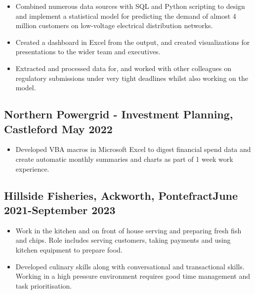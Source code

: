 \documentclass[9pt]{extarticle}
\begin{document}
\begin{minipage}{0.65\textwidth}
	\begin{itemize}
		\item Combined numerous data sources with SQL and Python scripting to design and implement a statistical model for predicting the demand of almost 4 million customers on low-voltage electrical distribution networks.\vspace{-.1cm}
		\item Created a dashboard in Excel from the output, and created visualizations for presentations to the wider team and executives. \vspace{-.1cm}
		\item Extracted and processed data for, and worked with other colleagues on regulatory submissions under very tight deadlines whilst also working on the model.
	\end{itemize}

	\vspace{-.5cm}




	\subsection{Northern Powergrid - Investment Planning, Castleford \hfill May 2022}
	\begin{itemize}
		\item Developed VBA macros in Microsoft Excel to digest financial spend data and create automatic monthly summaries and charts as part of 1 week work experience.
	\end{itemize}
	\vspace{-.5cm}



	\subsection{Hillside Fisheries, Ackworth, Pontefract\hfill June 2021-September 2023}
	\vspace{-.1cm}
	\begin{itemize}
		\item Work in the kitchen and on front of house serving and preparing fresh fish and chips. Role includes serving customers, taking payments and using kitchen equipment to prepare food.
		      \vspace{-.1cm}
		\item Developed culinary skills along with conversational and transactional skills. Working in a high pressure environment requires good time management and task prioritisation.
	\end{itemize}
	\vspace{-.5cm}





\end{minipage}
\end{document}
